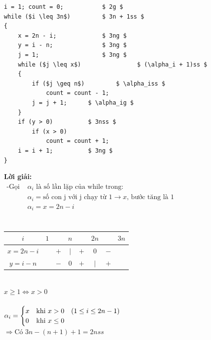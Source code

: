 \documentclass[12pt, letterpaper]{article}
\begin{document}
\begin{lstlisting}
i = 1; count = 0;      		$ 2g $
while ($i \leq 3n$)         $ 3n + 1ss $	
{
    x = 2n - i;        		$ 3ng $
    y = i - n;         		$ 3ng $
    j = 1;             		$ 3ng $
    while ($j \leq x$)        	      $ (\alpha_i + 1)ss $ 
    {
    	if ($j \geq n$)			$ \alpha_iss $
    	    count = count - 1;
        j = j + 1;		$ \alpha_ig $
    }
    if (y > 0)			$ 3nss $
        if (x > 0)
            count = count + 1;
    i = i + 1;			$ 3ng $
}
\end{lstlisting}
\textbf{Lời giải:} \\
$ \begin{aligned}
		\text{-Gọi } & \alpha_i \text{ là số lần lặp của while trong:}                                  \\
		             & \alpha_i = \text{số con j với j chạy từ 1} \rightarrow x \text{, bước tăng là 1} \\
		             & \alpha_i = x = 2n - i                                                            \\
	\end{aligned} $ \\
 \\
\begin{table}[htb]
	\begin{tabular}{c|c c c c c c c}
		$i$          & $1$ &     & $n$     &     & $2n$    &     & $3n$ \\
		\hline
		$x = 2n - i$ &     & $+$ & $\vert$ & $+$ & $0$     & $-$ &      \\
		$y = i - n$  &     & $-$ & $0$     & $+$ & $\vert$ & $+$ &      \\
	\end{tabular}
\end{table} \\
 $x \geq 1 \Leftrightarrow x > 0$ \\ \\
$\alpha_i =
\begin{cases}
	x & \text{khi } x>0 \quad (1 \leq i \leq 2n - 1) \\
	0 & \text{khi } x\leq 0
\end{cases} \\$
 \\
$\Rightarrow \text{Có } 3n - (n + 1) + 1 = 2nss$ \\
 \\
\end{document}
